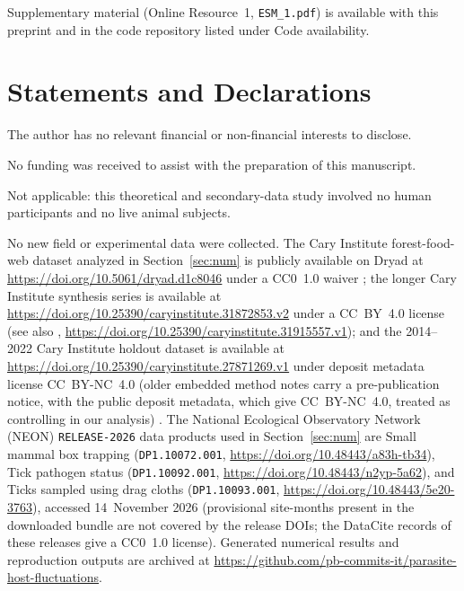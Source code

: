 \documentclass[pdflatex,sn-basic]{sn-jnl}
\theoremstyle{thmstyleone}%
\theoremstyle{thmstyletwo}%
\theoremstyle{thmstylethree}%
\begin{document}
\maketitle












\backmatter

Supplementary material (Online Resource~1, \texttt{ESM\_1.pdf}) is available with this preprint and in the code repository listed under Code availability.

\section*{Statements and Declarations}

The author has no relevant financial or non-financial interests to disclose.

No funding was received to assist with the preparation of this manuscript.

Not applicable: this theoretical and secondary-data study involved no human participants and no live animal subjects.

No new field or experimental data were collected. The Cary Institute forest-food-web dataset analyzed in Section~\ref{sec:num} is publicly available on Dryad at \url{https://doi.org/10.5061/dryad.d1c8046} under a CC0~1.0 waiver \citep{ostfeld20182019}; the longer Cary Institute synthesis series is available at \url{https://doi.org/10.25390/caryinstitute.31872853.v2} under a CC~BY~4.0 license \citep{ostfeld2026b} (see also \citealp{ostfeld2026a}, \url{https://doi.org/10.25390/caryinstitute.31915557.v1}); and the 2014--2022 Cary Institute holdout dataset is available at \url{https://doi.org/10.25390/caryinstitute.27871269.v1} under deposit metadata license CC~BY-NC~4.0 (older embedded method notes carry a pre-publication notice, with the public deposit metadata, which give CC~BY-NC~4.0, treated as controlling in our analysis) \citep{ladeau2025}. The National Ecological Observatory Network (NEON) \texttt{RELEASE-2026} data products used in Section~\ref{sec:num} are Small mammal box trapping (\texttt{DP1.10072.001}, \url{https://doi.org/10.48443/a83h-tb34}), Tick pathogen status (\texttt{DP1.10092.001}, \url{https://doi.org/10.48443/n2yp-5a62}), and Ticks sampled using drag cloths (\texttt{DP1.10093.001}, \url{https://doi.org/10.48443/5e20-3763}), accessed 14~November 2026 \citep{neon2026a,neon2026b,neon2026c} (provisional site-months present in the downloaded bundle are not covered by the release DOIs; the DataCite records of these releases give a CC0~1.0 license). Generated numerical results and reproduction outputs are archived at \url{https://github.com/pb-commits-it/parasite-host-fluctuations}.
\end{document}

